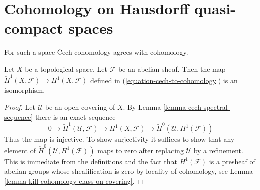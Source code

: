 \section{Cohomology on Hausdorff quasi-compact spaces}
\label{section-cohomology-LC}

\noindent
For such a space {\v C}ech cohomology agrees with cohomology.

\begin{lemma}
\label{lemma-cech-always}
Let $X$ be a topological space. Let $\mathcal{F}$ be an abelian sheaf. Then
the map $\check{H}^1(X, \mathcal{F}) \to H^1(X, \mathcal{F})$ defined
in (\ref{equation-cech-to-cohomology}) is an isomorphism.
\end{lemma}

\begin{proof}
Let $\mathcal{U}$ be an open covering of $X$.
By Lemma \ref{lemma-cech-spectral-sequence}
there is an exact sequence
$$
0 \to \check{H}^1(\mathcal{U}, \mathcal{F}) \to H^1(X, \mathcal{F})
\to \check{H}^0(\mathcal{U}, \underline{H}^1(\mathcal{F}))
$$
Thus the map is injective. To show surjectivity it suffices to show that
any element of $\check{H}^0(\mathcal{U}, \underline{H}^1(\mathcal{F}))$
maps to zero after replacing $\mathcal{U}$ by a refinement.
This is immediate from the definitions and the fact that
$\underline{H}^1(\mathcal{F})$ is a presheaf of abelian groups
whose sheafification is zero by locality of cohomology, see
Lemma \ref{lemma-kill-cohomology-class-on-covering}.
\end{proof}

